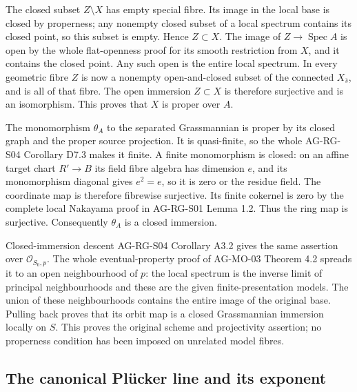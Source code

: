 \documentclass[11pt,a4paper,openany]{report}
\newcounter{none}
\begin{document}
The closed subset \(Z\setminus X\) has empty special fibre. Its image in the local base is closed by properness; any nonempty closed subset of a local spectrum contains its closed point, so this subset is empty. Hence \(Z\subset X\). The image of \(Z\to\operatorname{Spec}A\) is open by the whole flat-openness proof for its smooth restriction from \(X\), and it contains the closed point. Any such open is the entire local spectrum. In every geometric fibre \(Z\) is now a nonempty open-and-closed subset of the connected \(X_{\bar s}\), and is all of that fibre. The open immersion \(Z\subset X\) is therefore surjective and is an isomorphism. This proves that \(X\) is proper over \(A\).

The monomorphism \(\theta_A\) to the separated Grassmannian is proper by its closed graph and the proper source projection. It is quasi-finite, so the whole AG-RG-S04 Corollary D7.3 makes it finite. A finite monomorphism is closed: on an affine target chart \(R'\to B\) its field fibre algebra has dimension \(e\), and its monomorphism diagonal gives \(e^2=e\), so it is zero or the residue field. The coordinate map is therefore fibrewise surjective. Its finite cokernel is zero by the complete local Nakayama proof in AG-RG-S01 Lemma 1.2. Thus the ring map is surjective. Consequently \(\theta_A\) is a closed immersion.

Closed-immersion descent AG-RG-S04 Corollary A3.2 gives the same assertion over \(\mathcal O_{S_0,p}\). The whole eventual-property proof of AG-MO-03 Theorem 4.2 spreads it to an open neighbourhood of \(p\): the local spectrum is the inverse limit of principal neighbourhoods and these are the given finite-presentation models. The union of these neighbourhoods contains the entire image of the original base. Pulling back proves that its orbit map is a closed Grassmannian immersion locally on \(S\). This proves the original scheme and projectivity assertion; no properness condition has been imposed on unrelated model fibres.

\subsection{The canonical Plücker line and its exponent}\label{AG-RG-03-the-canonical-pluxfccker-line-and-its-exponent}
\end{document}
